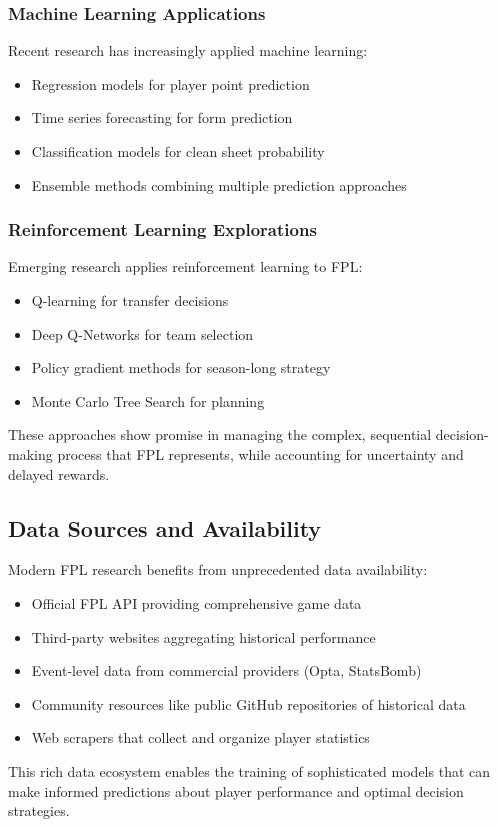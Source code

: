 \subsubsection{Machine Learning Applications}

Recent research has increasingly applied machine learning:
\begin{itemize}
    \item Regression models for player point prediction
    \item Time series forecasting for form prediction
    \item Classification models for clean sheet probability
    \item Ensemble methods combining multiple prediction approaches \cite{guo2017, baboota2019}
\end{itemize}

\subsubsection{Reinforcement Learning Explorations}

Emerging research applies reinforcement learning to FPL:
\begin{itemize}
    \item Q-learning for transfer decisions
    \item Deep Q-Networks for team selection
    \item Policy gradient methods for season-long strategy
    \item Monte Carlo Tree Search for planning \cite{hubacek2019, rahimian2021}
\end{itemize}

These approaches show promise in managing the complex, sequential decision-making process that FPL represents, while accounting for uncertainty and delayed rewards.

\subsection{Data Sources and Availability}

Modern FPL research benefits from unprecedented data availability:
\begin{itemize}
    \item Official FPL API providing comprehensive game data
    \item Third-party websites aggregating historical performance
    \item Event-level data from commercial providers (Opta, StatsBomb)
    \item Community resources like public GitHub repositories of historical data
    \item Web scrapers that collect and organize player statistics \cite{pappalardo2019, decroos2020}
\end{itemize}

This rich data ecosystem enables the training of sophisticated models that can make informed predictions about player performance and optimal decision strategies.
